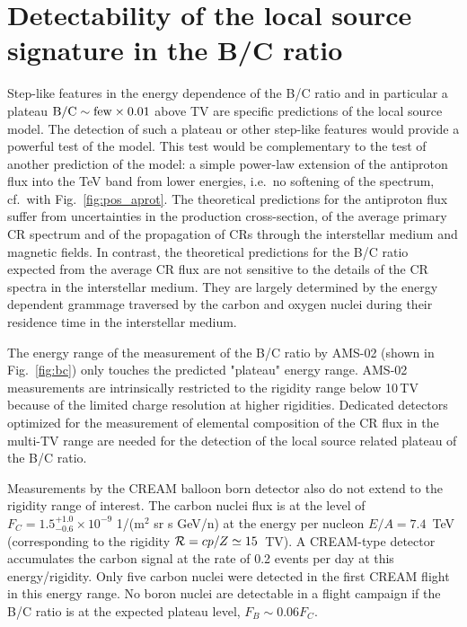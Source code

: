 \documentclass[prd,aps,twocolumn]{revtex4}
\def\R{{\cal R}}
\begin{document}
\section{Detectability of the local source signature in the B/C ratio}

Step-like features in the energy dependence of the B/C ratio and in particular
a plateau ${\rm B/C}\sim {\rm few} \times 0.01$ above TV are specific 
predictions of 
the local source model. The detection of such a plateau or other step-like
features would provide a powerful test of the model. This test would be 
complementary to the test of another prediction of the model: a simple 
power-law extension of  the antiproton flux into the TeV band from lower
energies, i.e.\ no softening of the spectrum, cf.\ with 
Fig.~\ref{fig:pos_aprot}. The theoretical predictions for the antiproton flux 
suffer from  uncertainties in the production cross-section, 
of the average primary CR spectrum and of the propagation of CRs through the 
interstellar medium and magnetic fields. In contrast, the theoretical 
predictions for the B/C ratio expected from the average CR flux are not 
sensitive to the details of the CR spectra in the interstellar medium. They are largely determined by the energy dependent grammage traversed by the carbon and oxygen nuclei during their residence time in the interstellar medium. 

The energy range of the measurement of the B/C ratio by AMS-02 (shown in 
Fig.~\ref{fig:bc}) only touches the predicted "plateau" energy range. 
AMS-02 measurements are intrinsically restricted to the rigidity range below 
10\,TV because of the limited charge resolution at higher rigidities. 
Dedicated detectors optimized for the measurement of elemental composition 
of the CR flux in the multi-TV range are needed for the detection of 
the local source related plateau of the B/C ratio. 

Measurements by the CREAM balloon born detector also do not extend to the 
rigidity range of interest. The carbon nuclei flux is at the level of 
$F_C=1.5_{-0.6}^{+1.0}\times 10^{-9}$ 1/(m$^2$ sr s GeV/n) at the energy per 
nucleon $E/A=7.4$~TeV (corresponding to the rigidity $\R=cp/Z\simeq 15$~TV).
A CREAM-type detector accumulates the 
carbon signal at the rate of 0.2 events per day at this energy/rigidity. 
Only five carbon nuclei were detected in the first CREAM flight in this energy 
range. No boron nuclei are detectable in a flight campaign if the B/C ratio 
is at the expected plateau level, $F_B\sim 0.06 F_C$.
\end{document}
